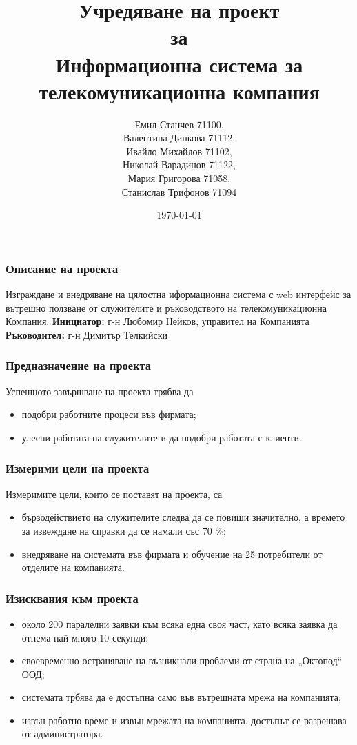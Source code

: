 \documentclass{beamer}
\title[Учредяване на проект за Информационна система за телекомуникационна компания]{Учредяване на проект \\ за \\ Информационна система за телекомуникационна компания}
\author{Емил Станчев 71100,\\
Валентина Динкова 71112,\\
Ивайло Михайлов 71102,\\
Николай Варадинов 71122,\\
Мария Григорова 71058,\\
Станислав Трифонов 71094}
\institute{ФМИ}
\date{\today}
\begin{document}
\begin{frame}
  \titlepage
\end{frame}

\begin{frame}
  \frametitle{Описание на проекта}
Изграждане и внедряване на цялостна иформационна система с web интерфейс за вътрешно ползване 
от служителите и ръководството на телекомуникационна Компания. 
\newline
\newline
\textbf{Инициатор:} г-н Любомир Нейков, управител на Компанията
\textbf{Ръководител:} г-н Димитър Телкийски
\end{frame}

\begin{frame}
  \frametitle{Предназначение на проекта}
  Успешното завършване на проекта трябва да
  \begin{itemize}
      \item подобри работните процеси във фирмата;
      \item улесни работата на служителите и да подобри работата с клиенти.
  \end{itemize}
\end{frame}

\begin{frame}
  \frametitle{Измерими цели на проекта}
  Измеримите цели, които се поставят на проекта, са
  \begin{itemize}
    \item бързодействието на служителите следва да се повиши значително, а времето за извеждане на справки да се 
        намали със 70 \%;
    \item внедряване на системата във фирмата и обучение на 25 потребители от отделите на компанията.
  \end{itemize}
\newline
\newline
\end{frame}

\begin{frame}
  \frametitle{Изисквания към проекта}
  \begin{itemize}
      \item около 200 паралелни заявки към всяка една своя част, като всяка заявка да отнема най-много 10 секунди;
      \item своевременно остраняване на възникнали проблеми от страна на „Октопод“ ООД;
      \item системата трбява да е достъпна само във вътрешната мрежа на компанията;
      \item извън работно време и извън мрежата на компанията, достъпът се разрешава от администратора.
  \end{itemize}
\end{frame}
\end{document}
